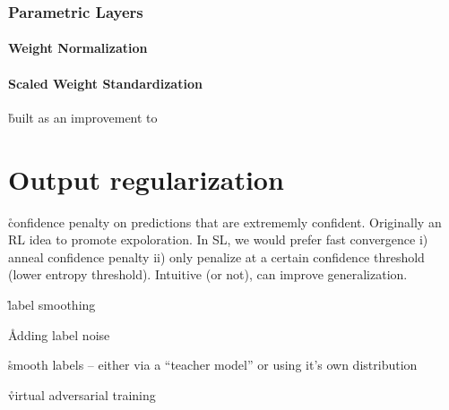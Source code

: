 





\subsubsection{Parametric Layers}

\paragraph{Weight Normalization}



\paragraph{Scaled Weight Standardization}


\r{built as an improvement to}



\section{Output regularization}

\r{confidence penalty on predictions that are extrememly confident\cite{pereyra2017regularizing}. Originally an RL idea to promote expoloration. In SL, we would prefer fast convergence i) anneal confidence penalty ii) only penalize at a certain confidence threshold (lower entropy threshold). Intuitive (or not), can improve generalization.}

\r{label smoothing\cite{szegedy2016rethinking}}

\r{Adding label noise\cite{xie2016disturblabel}}

\r{smooth labels -- either via a ``teacher model''\cite{hinton2015distilling} or using it's own distribution\cite{reed2014training}}

\r{virtual adversarial training\cite{miyato2018virtual}}